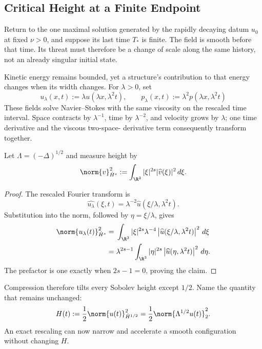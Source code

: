 
\subsection{Critical Height at a Finite Endpoint}\label{sub:CriticalHeightAtAFiniteEndpoint}

Return to the one maximal solution generated by the rapidly decaying datum
\(u_0\) at fixed \(\nu>0\), and suppose its last time \(T_*\) is finite.  The
field is smooth before that time.  Its threat must therefore be a change of
scale along the same history, not an already singular initial state.

Kinetic energy remains bounded, yet a structure’s contribution to that energy
changes when its width changes.  For \(\lambda>0\), set
\[
  u_\lambda(x,t)
  :=
  \lambda u(\lambda x,\lambda^2t),
  \qquad
  p_\lambda(x,t)
  :=
  \lambda^2p(\lambda x,\lambda^2t)
\]
These fields solve Navier--Stokes with the same viscosity on the rescaled time
interval.  Space contracts by \(\lambda^{-1}\), time by \(\lambda^{-2}\), and
velocity grows by \(\lambda\); one time derivative and the viscous two-space-
derivative term consequently transform together.

Let \(\Lambda=(-\Delta)^{1/2}\) and measure height by
\[
  \norm{v}_{\dot H^s}^2
  :=
  \int_{\R^3}
  |\xi|^{2s}|\widehat v(\xi)|^2
  \,d\xi.
\]
\begin{proof}
The rescaled Fourier transform is
\[
  \widehat{u_\lambda}(\xi,t)
  =
  \lambda^{-2}
  \widehat u(\xi/\lambda,\lambda^2t).
\]
Substitution into the norm, followed by \(\eta=\xi/\lambda\), gives
\begin{align*}
  \norm{u_\lambda(t)}_{\dot H^s}^2
  &={}
  \int_{\R^3}
  |\xi|^{2s}\lambda^{-4}
  \left|\widehat u(\xi/\lambda,\lambda^2t)\right|^2
  \,d\xi
  \\
  &={}
  \lambda^{2s-1}
  \int_{\R^3}
  |\eta|^{2s}
  \left|\widehat u(\eta,\lambda^2t)\right|^2
  \,d\eta.
\end{align*}
The prefactor is one exactly when \(2s-1=0\), proving the claim.
\end{proof}
Compression therefore tilts every Sobolev height except \(1/2\).  Name the
quantity that remains unchanged:
\[
  H(t)
  :=
  \frac12\norm{u(t)}_{\dot H^{1/2}}^2
  =
  \frac12\norm{\Lambda^{1/2}u(t)}_2^2.
\]
An exact rescaling can now narrow and accelerate a smooth configuration without
changing \(H\).

